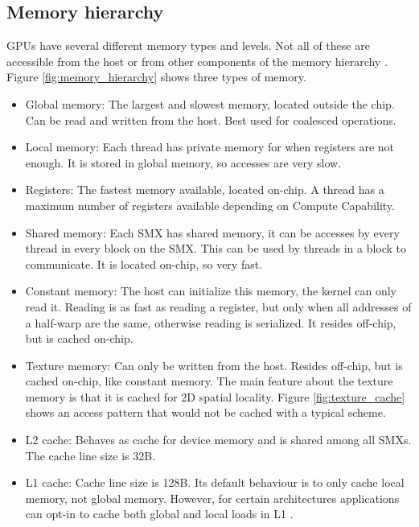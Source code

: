 \documentclass[../main/thesis.tex]{subfiles}
\begin{document}





\subsection{Memory hierarchy}
GPUs have several different memory types and levels.
Not all of these are accessible from the host or from other components of the memory hierarchy \cite{cuda}. Figure \ref{fig:memory_hierarchy} shows three types of memory.
\begin{itemize}
\item Global memory: The largest and slowest memory, located outside the chip. Can be read and written from the host. Best used for coalesced operations.
\item Local memory: Each thread has private memory for when registers are not enough. It is stored in global memory, so accesses are very slow.
\item Registers: The fastest memory available, located on-chip. A thread has a maximum number of registers available depending on Compute Capability.
\item Shared memory: Each SMX has shared memory, it can be accesses by every thread in every block on the SMX. This can be used by threads in a block to communicate. It is located on-chip, so very fast.
\item Constant memory: The host can initialize this memory, the kernel can only read it. Reading is as fast as reading a register, but only when all addresses of a half-warp are the same, otherwise reading is serialized. It resides off-chip, but is cached on-chip.
\item Texture memory: Can only be written from the host. Resides off-chip, but is cached on-chip, like constant memory. The main feature about the texture memory is that it is cached for 2D spatial locality. Figure \ref{fig:texture_cache} shows an access pattern that would not be cached with a typical scheme.
\item L2 cache: Behaves as cache for device memory and is shared among all SMXs. The cache line size is 32B.
\item L1 cache: Cache line size is 128B. Its default behaviour is to only cache local memory, not global memory. However, for certain architectures applications can opt-in to cache both global and local loads in L1 \cite{L1cache}.
\end{itemize}
\end{document}
